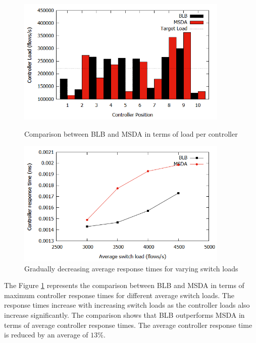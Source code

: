 \documentclass[preprint,12pt]{elsarticle}
\begin{document}
	\begin{figure}
		\centering
		\includegraphics[width=0.9\textwidth]{Images/load_comparison.png}
		\caption{Comparison between BLB and MSDA in terms of load per controller} \label{fig:Lcomparison}
		\vspace{1cm}
		\centering
		\includegraphics[width=0.9\textwidth]{Images/response_comparison.png}
		\caption{Gradually decreasing average response times for varying switch loads} \label{fig:Rcomparison}
	\end{figure}
	
	
	The Figure \ref{fig:Rcomparison} represents the comparison between BLB and MSDA in terms of maximum controller response times for different average switch loads. The response times increase with increasing switch loads as the controller loads also increase significantly. The comparison shows that BLB outperforms MSDA in terms of average controller response times. The average controller response time is reduced by an average of $13\%$.
\end{document}
